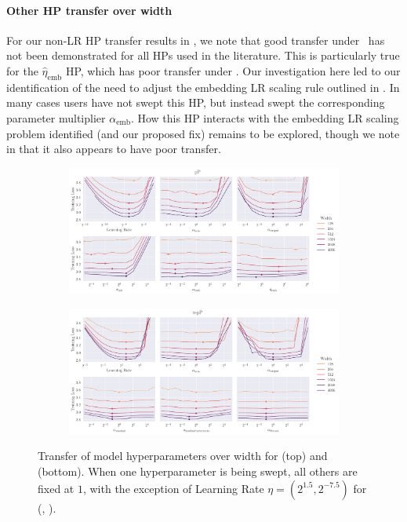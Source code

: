 \paragraph{Other HP transfer over width} For our non-LR HP transfer results in , we note that good transfer under \mup\ has not been demonstrated for all HPs used in the literature. This is particularly true for the $\hat{\eta}_\mathrm{emb}$ HP, which has poor transfer under \mup. Our investigation here led to our identification of the need to adjust the embedding LR scaling rule outlined in . In many cases users have not swept this HP, but instead swept the corresponding parameter multiplier $\alpha_\mathrm{emb}$. How this HP interacts with the embedding LR scaling problem identified (and our proposed fix) remains to be explored, though we note in  that it also appears to have poor transfer.

\begin{figure}[h]
    \centering
    \begin{subfigure}{\textwidth}
        \centering
        \includegraphics[width=\textwidth]{arXiv/figures/hp_transfer_mup.pdf}
    \vspace{1em}
    \end{subfigure}
    \begin{subfigure}{\textwidth}
        \centering
        \includegraphics[width=\textwidth]{arXiv/figures/hp_transfer_u-mup.pdf}
    \end{subfigure}
    \caption{Transfer of model hyperparameters over width for \mup{} (top) and \umup{} (bottom). When one hyperparameter is being swept, all others are fixed at $1$, with the exception of Learning Rate $\eta=(2^{1.5}, 2^{-7.5})$ for (\umup{}, \mup{}).}
    \label{fig:experiments:hp_transfer_over_width}
\end{figure}

